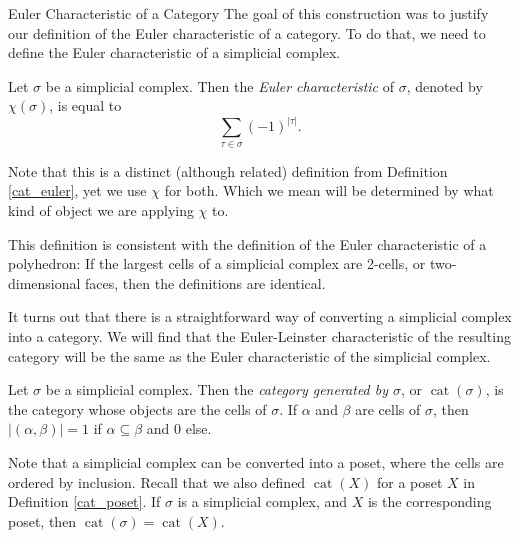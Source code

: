 \documentclass[12pt]{pom_thesis}
\DeclareMathOperator{\cat}{cat}
\begin{document}
\begin{chapter}{Euler Characteristic of a Category}
The goal of this construction was to justify our definition of the Euler characteristic of a category. To do that, we need to define the Euler characteristic of a simplicial complex.
\begin{defn}
Let $\sigma$ be a simplicial complex. Then the \emph{Euler characteristic} of $\sigma$, denoted by $\chi(\sigma)$, is equal to
\[
\sum_{\tau \in \sigma}(-1)^{|\tau|}.
\]
\end{defn}
Note that this is a distinct (although related) definition from Definition \ref{cat_euler}, yet we use $\chi$ for both. Which we mean will be determined by what kind of object we are applying $\chi$ to. 

This definition is consistent with the definition of the Euler characteristic of a polyhedron: If the largest cells of a simplicial complex are 2-cells, or two-dimensional faces, then the definitions are identical. 

It turns out that there is a straightforward way of converting a simplicial complex into a category. We will find that the Euler-Leinster characteristic of the resulting category will be the same as the Euler characteristic of the simplicial complex. 
\begin{defn}
Let $\sigma$ be a simplicial complex. Then the \emph{category generated by $\sigma$}, or $\cat(\sigma)$, is the category whose objects are the cells of $\sigma$. If $\alpha$ and $\beta$ are cells of $\sigma$, then $|(\alpha, \beta)| = 1$ if $\alpha \subseteq \beta$ and 0 else.
\end{defn}
Note that a simplicial complex can be converted into a poset, where the cells are ordered by inclusion. Recall that we also defined $\cat(X)$ for a poset $X$ in Definition \ref{cat_poset}. If $\sigma$ is a simplicial complex, and $X$ is the corresponding poset, then $\cat(\sigma) = \cat(X)$.


\end{chapter}
\end{document}
